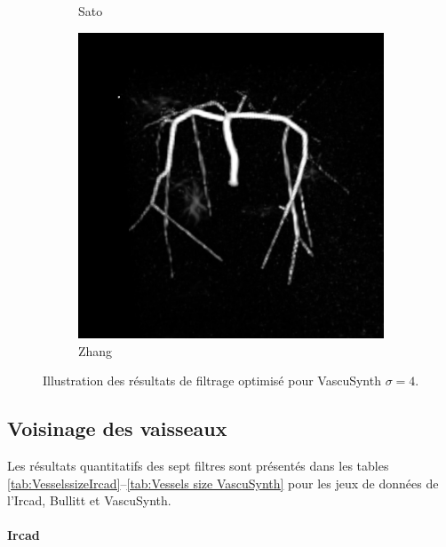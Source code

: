 \begin{figure}[!ht]
\begin{subfigure}[t]{0.32\textwidth}
    \caption{Sato}
  \end{subfigure}
  \begin{subfigure}[t]{0.32\textwidth}
    \includegraphics[clip = true, trim = 80 80 80 80,width=\textwidth]{Images/Vascu_4_Zhang.png}
    \caption{Zhang}
  \end{subfigure}
  \centering
  \caption{Illustration des résultats de filtrage optimisé pour VascuSynth $\sigma=4$.}
  \label{fig:qualitative results VascuSynth}
\end{figure}

\subsection{Voisinage des vaisseaux}
Les résultats quantitatifs des sept filtres sont présentés dans les tables \ref{tab:VesselssizeIrcad}--\ref{tab:Vessels size VascuSynth} pour les jeux de données de l'Ircad, Bullitt et VascuSynth.

\paragraph{Ircad}

